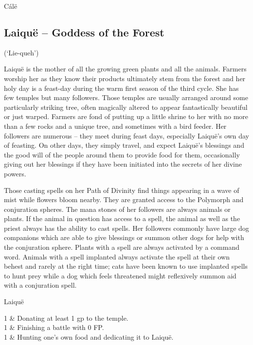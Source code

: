 \begin{multicols}{2}
\begin{xpchart}{C\'{a}l\"{e}}
\end{xpchart}

\subsection[Laiqu\"{e} -- Goddess of the Forest]{Laiqu\"{e} -- Goddess of the Forest}
\noindent (`Lie-queh')

Laiqu\"{e} is the mother of all the growing green plants and all the animals. Farmers worship her as they know their products ultimately stem from the forest and her holy day is a feast-day during the warm first season of the third cycle. She has few temples but many followers. Those temples are usually arranged around some particularly striking tree, often magically altered to appear fantastically beautiful or just warped. Farmers are fond of putting up a little shrine to her with no more than a few rocks and a unique tree, and sometimes with a bird feeder. Her followers are numerous -- they meet during feast days, especially Laiqu\"{e}'s own day of feasting. On other days, they simply travel, and expect Laiqu\"{e}'s blessings and the good will of the people around them to provide food for them, occasionally giving out her blessings if they have been initiated into the secrets of her divine powers.

Those casting spells on her Path of Divinity find things appearing in a wave of mist while flowers bloom nearby.
They are granted access to the Polymorph and conjuration spheres.
The mana stones of her followers are always animals or plants.
If the animal in question has access to a spell, the animal as well as the priest always has the ability to cast spells.
Her followers commonly have large dog companions which are able to give blessings or summon other dogs for help with the conjuration sphere.
Plants with a spell are always activated by a command word.
Animals with a spell implanted always activate the spell at their own behest and rarely at the right time; cats have been known to use implanted spells to hunt prey while a dog which feels threatened might reflexively summon aid with a conjuration spell.

	\begin{xpchart}{Laiqu\"{e}}

	1 & Donating at least 1 gp to the temple. \\

	1 & Finishing a battle with 0 FP. \\

		1 & Hunting one's own food and dedicating it to Laiqu\"{e}. \\


\end{xpchart}
\end{multicols}
